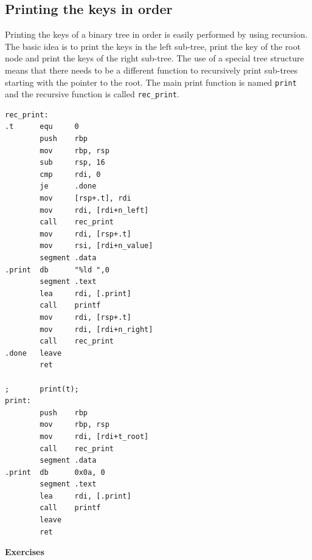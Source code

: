 \documentclass[11pt,b5paper]{book}
\begin{document}
\subsection{Printing the keys in order}

Printing the keys of a binary tree in order is easily performed by using recursion.
The basic idea is to print the keys in the left sub-tree, print the key of the root node and print the keys of
the right sub-tree.
The use of a special tree structure means that there needs to be a different
function to recursively print sub-trees
starting with the pointer to the root.
The main print function is named {\tt print} and the recursive function is called {\tt rec\_print}.

\begin{verbatim}
rec_print:
.t      equ     0
        push    rbp
        mov     rbp, rsp
        sub     rsp, 16
        cmp     rdi, 0
        je      .done
        mov     [rsp+.t], rdi
        mov     rdi, [rdi+n_left]
        call    rec_print
        mov     rdi, [rsp+.t]
        mov     rsi, [rdi+n_value]
        segment .data
.print  db      "%ld ",0
        segment .text
        lea     rdi, [.print]
        call    printf
        mov     rdi, [rsp+.t]
        mov     rdi, [rdi+n_right]
        call    rec_print
.done   leave
        ret

;       print(t);
print:
        push    rbp
        mov     rbp, rsp
        mov     rdi, [rdi+t_root]
        call    rec_print
        segment .data
.print  db      0x0a, 0
        segment .text
        lea     rdi, [.print]
        call    printf
        leave
        ret
\end{verbatim}

\vfill
\break
{\bf\large Exercises}
\end{document}
